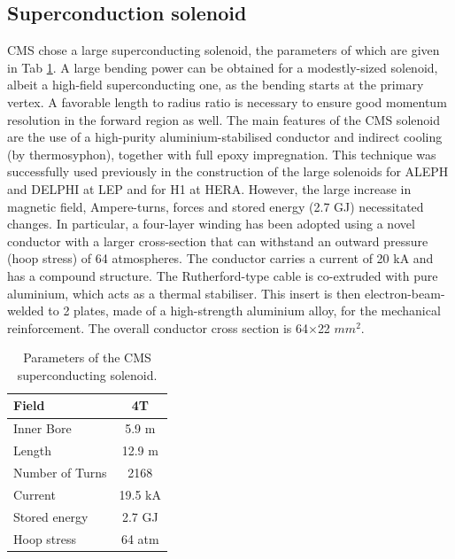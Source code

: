 \subsection{Superconduction solenoid}
CMS chose a large superconducting solenoid, the parameters of which are given in Tab \ref{tab:magnet}. A large bending power can be obtained for a modestly-sized solenoid, albeit a high-field superconducting one, as the bending starts at the primary vertex. A favorable length to radius ratio is necessary to ensure good momentum resolution in the forward region as well.
\newline The main features of the CMS solenoid are the use of a high-purity aluminium-stabilised
conductor and indirect cooling (by thermosyphon), together with full epoxy impregnation.
This technique was successfully used previously in the construction of the large solenoids for
ALEPH and DELPHI at LEP and for H1 at HERA. However, the large increase in magnetic field, Ampere-turns, forces and stored energy (2.7 GJ) necessitated
changes. In particular, a four-layer winding has been adopted using a novel conductor with a
larger cross-section that can withstand an outward pressure (hoop stress) of 64 atmospheres.
The conductor carries a current of 20 kA and has a compound structure. The Rutherford-type
cable is co-extruded with pure aluminium, which acts as a thermal stabiliser. This insert is
then electron-beam-welded to 2 plates, made of a high-strength aluminium alloy, for the
mechanical reinforcement. The overall conductor cross section is 64$\times$22 $mm^{2}$.

\begin{table}[h]
 \begin{center}
  \begin{tabular}{|l|c|}
\hline
Field & 4T \\
\hline
Inner Bore & 5.9 m \\
\hline
Length & 12.9 m \\
\hline
Number of Turns & 2168 \\
\hline
Current & 19.5 kA \\
\hline
Stored energy & 2.7 GJ \\
\hline
Hoop stress & 64 atm \\
\hline
\end{tabular}
\caption{\label{tab:magnet} Parameters of the CMS superconducting solenoid.}
\end{center}
\end{table}

